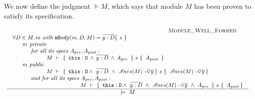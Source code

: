 {We now define the judgment $\models M$, which says that module $M$ has been proven to satisfy its specification.

$
\\ \\
\begin{array}{l}
\inferruleSD {  ~ \strut \hspace{3cm} {\sc{Module\_Well\_Formed}}}
{
\begin{array}{l} 
\forall  D\in M,  m   \textit{ with } \prg{mBody}(m,D,M)=\overline{y:D}\{\  s \ \}      \\
        ~ \strut \hspace{0.5cm} m \textit{ private}  \\ 
            ~ \strut \hspace{0.9cm} \textit{ for all its  specs } A_{pre},  A_{post}:\\ 
             ~\strut \hspace{2cm}
 					   {\hproves{M} { \ \prg{this}:\prg{D}\, \wedge\, \overline{y:D}\, \wedge\, A_{pre}\  } {\ s\ } {\ A_{post} \ } }\\
      ~ \strut \hspace{0.5cm} m \textit{ public}  \\ 
           ~ \strut \hspace{2cm}  { \hproves {M} {\ \prg{this}:\prg{D} \wedge\ \overline{y:D}   \ \wedge \ \PushAS {y} {\extract{M} } } {\ s\ } {\ \PushAS {y}{\extract{M}} } } \\
        ~ \strut \hspace{0.9cm} \textit{ and for all its  specs } A_{pre},  A_{post}:\\ 
             ~\strut \hspace{2cm}   
              ~ \strut \hspace{2cm}  { \hproves {M} {\ \prg{this}:\prg{D} \wedge\ \overline{y:D}  \ \wedge \ \PushAS {y} {\extract{M} } \ \wedge \ A_{pre}\ } {\ s\ } {\ A_{post} }  }
\end{array}
}					  					  
{   
	\ \models\ M \ 
}
\end{array}
$


}
